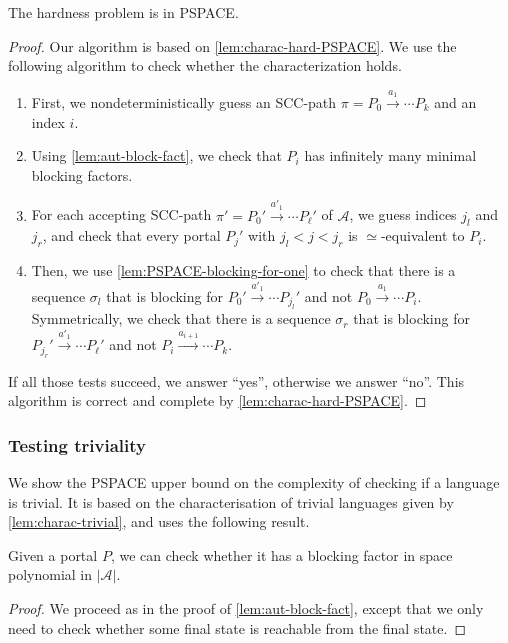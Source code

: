 \documentclass[letterpaper, USenglish, cleveref, autoref, thm-restate, numberwithinsect]{lipics-v2021}
\theoremstyle{theorem}
\theoremstyle{definition}
\newcommand{\Aa}{\mathcal{A}}
\newcommand{\equivportals}{\simeq}
\newcommand{\PSPACE}{\textsf{PSPACE}\xspace}
\newcommand{\SCCpath}{\pi}
\begin{document}
\begin{proposition}
	\label{prop:hard-to-test-PSPACE}
	The hardness problem is in \PSPACE.
\end{proposition}
\begin{proof}
	Our algorithm is based on \cref{lem:charac-hard-PSPACE}.
	We use the following algorithm to check whether the characterization holds.
	\begin{enumerate}
		\item First, we nondeterministically guess an SCC-path $\SCCpath = P_0 \xrightarrow{a_1} \cdots  P_k$ and an index $i$.
		\item Using \cref{lem:aut-block-fact}, we check that $P_i$ has infinitely many minimal blocking factors.
	
		\item For each accepting SCC-path $\SCCpath' = P_0' \xrightarrow{a'_1} \cdots  P_\ell'$  of $\Aa$, we guess indices $j_l$ and $j_r$, and check that every portal $P_j'$ with $j_l < j < j_r$ is $\equivportals$-equivalent to $P_i$.

		\item Then, we use \cref{lem:PSPACE-blocking-for-one} to check that there is a sequence $\sigma_l$ that is blocking for $P_0' \xrightarrow{a'_1} \cdots  P_{j_l}'$ and not $P_0 \xrightarrow{a_1} \cdots P_i$.
		Symmetrically, we check that there is a sequence $\sigma_r$ that is blocking for $P_{j_r}' \xrightarrow{a'_1} \cdots  P_\ell'$ and not $P_i \xrightarrow{a_{i+1}} \cdots  P_k$.
	\end{enumerate}
	
	If all those tests succeed, we answer ``yes'', otherwise we answer ``no''.
	This algorithm is correct and complete by \cref{lem:charac-hard-PSPACE}.
\end{proof}


\subsubsection{Testing triviality}

We show the \PSPACE upper bound on the complexity of checking if a language is trivial.
It is based on the characterisation of trivial languages given by \cref{lem:charac-trivial}, and uses the following result.

\begin{lemma}
	\label{lem:exists-blocking-fact}
	Given a portal $P$, we can check whether it has a blocking factor in space polynomial in $|\Aa|$.
\end{lemma}
\begin{proof}
	We proceed as in the proof of \cref{lem:aut-block-fact}, except that we only need to check whether some final state is reachable from the final state.
\end{proof}
\end{document}
